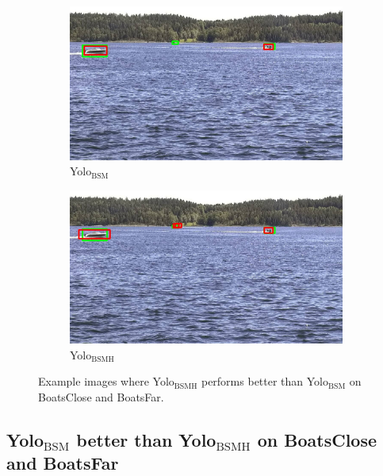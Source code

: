 \begin{figure}[h!]
\begin{subfigure}{.5\textwidth}
  \centering
  \includegraphics[width=0.9\linewidth]{results/case_buildings/yolo23/3better/yolo2/selected_06_25_frame0264.jpg}
  \caption{Yolo$_{\text{BSM}}$}
\end{subfigure}%
\begin{subfigure}{.5\textwidth}
  \centering
  \includegraphics[width=.9\linewidth]{results/case_buildings/yolo23/3better/yolo3/selected_06_25_frame0264.jpg}
  \caption{Yolo$_{\text{BSMH}}$}
\end{subfigure}
\caption{Example images where Yolo$_{\text{BSMH}}$ performs better than Yolo$_{\text{BSM}}$ on BoatsClose and BoatsFar.}
\label{img:yolo3_better}

\end{figure}

\newpage

\subsection{Yolo$_{\text{BSM}}$ better than Yolo$_{\text{BSMH}}$ on BoatsClose and BoatsFar}
\label{sec:2better}

